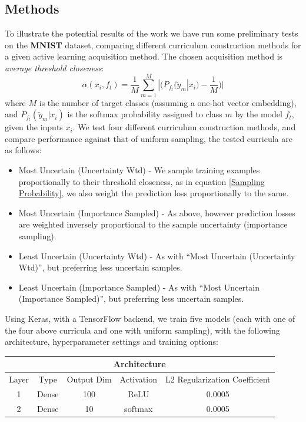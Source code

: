 \documentclass[a4paper,10.5pt]{article}
\begin{document}
\subsection*{Methods}
To illustrate the potential results of the work we have run some preliminary tests on the \textbf{MNIST} dataset, comparing different curriculum construction methods for a given active learning acquisition method. The chosen acquisition method is \textit{average threshold closeness}:
\begin{equation}
\alpha(x_i,f_t) = \frac{1}{M}\sum_{m=1}^{M} |(P_{f_t}(\tilde{y}_m|x_i) - \frac{1}{M})|
\end{equation}
where $M$ is the number of target classes (assuming a one-hot vector embedding), and $P_{f_t}(\tilde{y}_m|x_i)$ is the softmax probability assigned to class $m$ by the model $f_t$, given the inputs $x_i$. We test four different curriculum construction methods, and compare performance against that of uniform sampling, the tested curricula are as follows:
\begin{itemize}
\item Most Uncertain (Uncertainty Wtd) - We sample training examples proportionally to their threshold closeness, as in equation \ref{Sampling Probability}, we also weight the 	prediction loss proportionally to the same.
\item Most Uncertain (Importance Sampled) - As above, however prediction losses are weighted inversely proportional to the sample uncertainty (importance sampling).
\item Least Uncertain (Uncertainty Wtd) - As with ``Most Uncertain (Uncertainty Wtd)'', but preferring less uncertain samples.
\item Least Uncertain (Importance Sampled) - As with ``Most Uncertain (Importance Sampled)'', but preferring less uncertain samples.
\end{itemize}
Using Keras, with a TensorFlow backend, we train five models (each with one of the four above curricula and one with uniform sampling), with the following architecture, hyperparameter settings and training options:
\begin{center}
\begin{tabular}{|c|c|c|c|c|}
\hline
\multicolumn{5}{|c|}{Architecture} \\
\hline
Layer & Type & Output Dim & Activation & L2 Regularization Coefficient \\
\hline
1 & Dense & 100 & ReLU & 0.0005 \\
2 & Dense & 10 & softmax & 0.0005 \\
\hline
\end{tabular}
\end{center}
\end{document}
